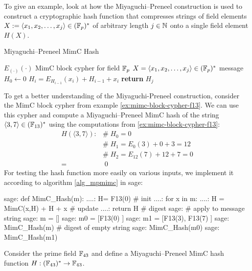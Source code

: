 To give an example, look at how the Miyaguchi–Preneel construction is used to construct a cryptographic hash function that compresses strings of field elements $X:=\langle x_1,x_2,\ldots, x_j\rangle\in (\mathbb{F}_p)^*$ of arbitrary length $j\in \mathbb{N}$ onto a single field element $H(X)$.
\begin{algorithm}\caption{Miyaguchi–Preneel MimC Hash}
\label{alg_mpmimc}
\begin{algorithmic}[0]
\Require $E_{(\cdot)}(\cdot)$ MimC block cypher for field $\mathbb{F}_p$
\Require $X=\langle x_1,x_2,\ldots, x_j\rangle\in (\mathbb{F}_p)^*$ message 
\State $H_0 \gets 0$ 
	\State $H_i = E_{H_{i-1}}(x_i) + H_{i-1} + x_i $ 
\EndFor
\State \textbf{return} $H_j$ 
\EndProcedure
\end{algorithmic}
\end{algorithm}
\begin{example}
\label{ex:mimc-hash-f13} To get a better understanding of the Miyaguchi-Preneel construction, consider the MimC block cypher from example \ref{ex:mimc-block-cypher-f13}. We can use this cypher and compute a Miyaguchi–Preneel MimC hash of the string $\langle 3, 7\rangle\in (\mathbb{F}_{13})^*$ using the computations from \ref{ex:mimc-block-cypher-f13}:
\begin{align*}
H(\langle 3, 7\rangle): & \#\; H_0 = 0\\
                        & \#\; H_1 = E_0(3) + 0 + 3 = 12 \\
                        & \#\; H_2 = E_{12}(7) + 12 + 7 = 0 \\
                       = &\;  0
\end{align*}
For testing the hash function more easily on various inputs, we implement it according to algorithm \ref{alg_mpmimc} in sage:
\begin{sagecommandline}
sage: def MimC_Hash(m):
....:     H= F13(0) # init
....:     for x in m:
....:         H = MimC(x,H) + H + x # update
....:     return H # digest
sage: # apply to message string 
sage: m = []
sage: m0 = [F13(0) ]
sage: m1 = [F13(3), F13(7) ]
sage: MimC_Hash(m) # digest of empty string
sage: MimC_Hash(m0)
sage: MimC_Hash(m1)
\end{sagecommandline}
\end{example}
\begin{exercise}
\label{ex:mimc-f43}
Consider the prime field $\mathbb{F}_{43}$ and define a Miyaguchi–Preneel MimC hash function $H: (\mathbb{F}_{43})^*\to \mathbb{F}_{43}$.
\end{exercise}
